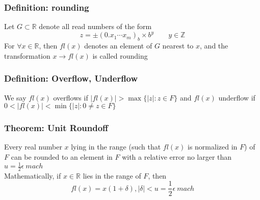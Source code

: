 \documentclass[11pt]{article}
\newcommand{\R}{{\mathbb{R}}}
\newcommand{\Z}{{\mathbb{Z}}}
\begin{document}
\subsubsection{Definition: rounding}
Let $G\subset\R$ denote all read numbers of the form 
\[z=\pm(0.x_1\cdots x_m)_b\times b^y\quad\quad y\in\Z\]
For $\forall x\in\R$, then $fl(x)$ denotes an element of $G$ nearest to $x$, and the transformation $x\rightarrow fl(x)$ is called rounding 
\subsubsection{Definition: Overflow, Underflow}
We say $fl(x)$ overflows if $|fl(x)|>\max\{|z|:z\in F\}$ and $fl(x)$ underflow if $0<|fl(x)|<\min\{|z|:0\neq z\in F\}$
\subsubsection{Theorem: Unit Roundoff}
Every real number $x$ lying in the range (such that $fl(x)$ is normalized in $F$) of $F$ can be rounded to an element in $F$ with a 
relative error no larger than $u=\frac{1}{2}\epsilon\ mach$\\
Mathematically, if $x\in\R$ lies in the range of $F$, then 
\[fl(x)=x(1+\delta), |\delta|<u=\frac{1}{2}\epsilon\ mach\]
\end{document}

